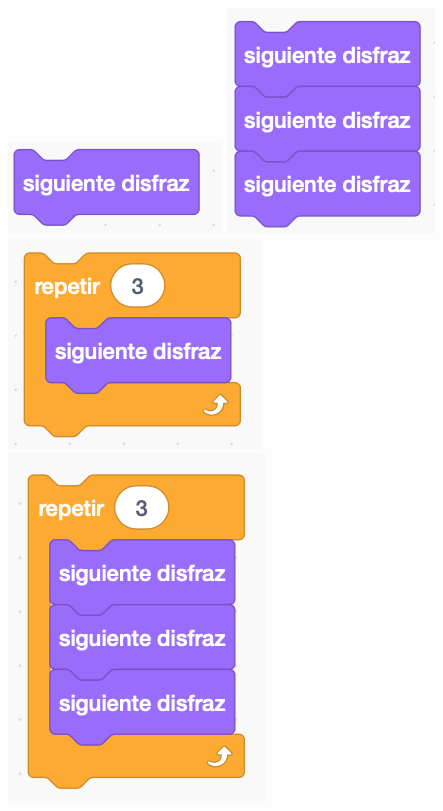 \documentclass[letterpaper,12pt]{article}
\begin{document}
\includegraphics[scale=.6,valign=t]{q3_script0.png} \hspace{1.5cm}
\includegraphics[scale=.6,valign=t]{q3_script1.png} \hspace{1.5cm}
\includegraphics[scale=.6,valign=t]{q3_script2.png} \hspace{1.5cm}
\includegraphics[scale=.6,valign=t]{q3_script3.png} \hspace{1.5cm} \\
\end{document}
